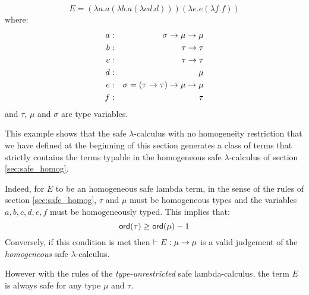 $$ E =  (\lambda a . a (\lambda b . a (\lambda c d .d))) (\lambda e . e (\lambda f .f))$$
where:
\begin{eqnarray*}
a &:& \sigma \rightarrow \mu \rightarrow \mu \\
b &:& \tau \rightarrow \tau \\
c &:& \tau \rightarrow \tau \\
d &:& \mu \\
e &:& \sigma = (\tau \rightarrow \tau) \rightarrow \mu \rightarrow \mu \\
f &:& \tau
\end{eqnarray*}
and $\tau$, $\mu$ and $\sigma$ are type variables.

This example shows that the safe $\lambda$-calculus with no
homogeneity restriction that we have defined at the beginning of
this section generates a class of terms that strictly contains the
terms typable in the homogeneous safe $\lambda$-calculus of section
\ref{sec:safe_homog}.

Indeed, for $E$ to be an homogeneous safe lambda term, in the sense
of the rules of section \ref{sec:safe_homog}, $\tau$ and $\mu$ must
be homogeneous types and the variables $a,b,c,d,e,f$ must be
homogeneously typed. This implies that:
$$ {\sf ord}(\tau) \geq {\sf ord}(\mu)-1$$
Conversely, if this condition is met then $\vdash E : \mu \rightarrow
\mu$ is a valid judgement of the \emph{homogeneous} safe
$\lambda$-calculus.

However with the rules of the \emph{type-unrestricted} safe
lambda-calculus, the term $E$ is always safe for any type $\mu$ and
$\tau$.
